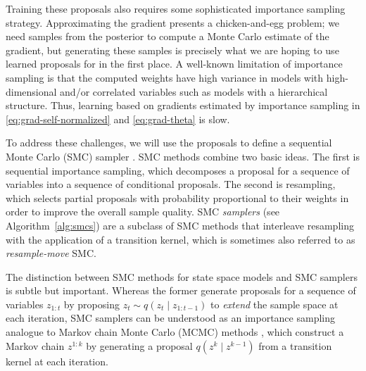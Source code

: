 \documentclass{article}
\theoremstyle{definition}
\begin{document}
Training these proposals also requires some sophisticated importance sampling strategy. 
Approximating the gradient presents a chicken-and-egg problem; we need samples from the posterior to compute a Monte Carlo estimate of the gradient, but generating these samples is precisely what we are hoping to use learned proposals for in the first place. 
A well-known limitation of importance sampling is that the computed weights have high variance in models with high-dimensional and/or correlated variables such as models with a hierarchical structure.
Thus, learning based on gradients estimated by importance sampling in \eqref{eq:grad-self-normalized} and \eqref{eq:grad-theta} is slow.


To address these challenges, we will use the proposals to define a sequential Monte Carlo (SMC) sampler \citep{delmoral2006sequential}.
SMC methods \cite{doucet2001sequential} combine two basic ideas. The first is sequential importance sampling, which decomposes a proposal for a sequence of variables into a sequence of conditional proposals. The second is resampling, which selects partial proposals with probability proportional to their weights in order to improve the overall sample quality. 
SMC \emph{samplers} (see  Algorithm~\ref{alg:smcs}) are a subclass of SMC methods that interleave resampling with the application of a transition kernel, which is sometimes also referred to as \emph{resample-move} SMC. 

The distinction between SMC methods for state space models and SMC samplers is subtle but important. Whereas the former generate proposals for a sequence of variables $z_{1:t}$ by proposing $z_t \sim q(z_t \mid z_{1:t-1})$ to \emph{extend} the sample space at each iteration, SMC samplers can be understood as an importance sampling analogue to Markov chain Monte Carlo (MCMC) methods \cite{brooks2011handbook}, which construct a Markov chain $z^{1:k}$ by generating a proposal $q(z^k \mid z^{k-1})$ from a transition kernel at each iteration.
\end{document}
